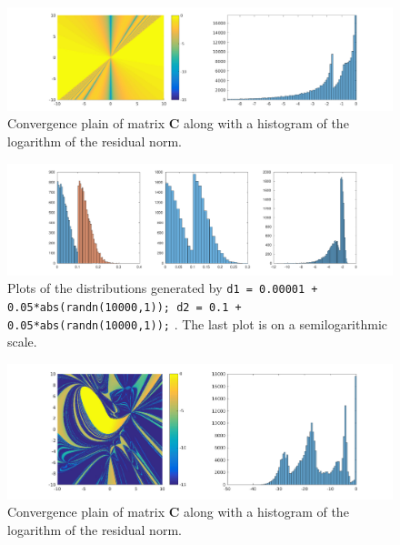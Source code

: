 \begin{figure}
\centering
\includegraphics[width=1.05\linewidth]{../src/figure/gmresCHist}
\caption{Convergence plain of matrix $\mathbf{C}$ along with a histogram of the logarithm of the residual norm.}
\label{fig:gmresCHist}
\end{figure}
\begin{figure}
\centering
\includegraphics[width=1.05\linewidth]{../src/figure/randnHist}
\caption{Plots of the distributions generated by
\texttt{d1 = 0.00001 + 0.05*abs(randn(10000,1));
d2 = 0.1 + 0.05*abs(randn(10000,1));} . The last plot is on a semilogarithmic scale. }
\label{fig:randnHist}
\end{figure}
\begin{figure}
\centering
\includegraphics[width=1.05\linewidth]{../src/figure/gmresBHist}
\caption{Convergence plain of matrix $\mathbf{C}$ along with a histogram of the logarithm of the residual norm.}
\label{fig:gmresBHist}
\end{figure}

